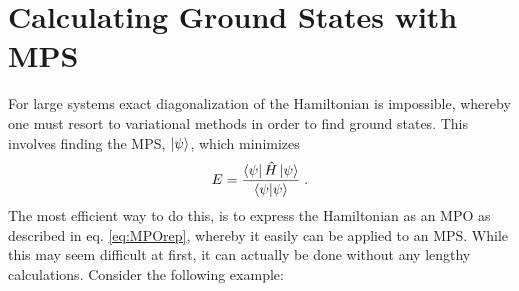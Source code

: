 \chapter{Calculating Ground States with MPS}
For large systems exact diagonalization of the Hamiltonian is impossible, whereby one must resort to variational methods in order to find ground states. This involves finding the MPS, $\ket{\psi}$, which minimizes
\begin{equation}
	E = \frac{\bra{\psi} \hat{H} \ket{\psi}}{\braket{\psi | \psi}} \; .
\end{equation}
The most efficient way to do this, is to express the Hamiltonian as an MPO as described in eq. \eqref{eq:MPOrep}, whereby it easily can be applied to an MPS. While this may seem difficult at first, it can actually be done without any lengthy calculations. Consider the following example:

